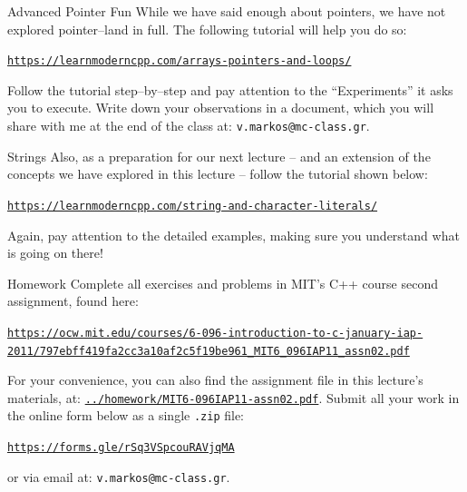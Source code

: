 \documentclass[aspectratio=169, 12pt]{beamer}
\newcommand{\ohref}[1]{\href{#1}{\texttt{#1}}}
\begin{document}
	\sectionframe
	
	\begin{frame}{Advanced Pointer Fun}
		While we have said enough about pointers, we have not explored pointer--land in full. The following tutorial will help you do so:
		\begin{center}
			\ohref{https://learnmoderncpp.com/arrays-pointers-and-loops/}
		\end{center}
		Follow the tutorial step--by--step and pay attention to the ``Experiments'' it asks you to execute. Write down your observations in a document, which you will share with me at the end of the class at: \texttt{v.markos@mc-class.gr}.
	\end{frame}
	
	\begin{frame}{Strings}
		Also, as a preparation for our next lecture -- and an extension of the concepts we have explored in this lecture -- follow the tutorial shown below:
		\begin{center}
			\ohref{https://learnmoderncpp.com/string-and-character-literals/}
		\end{center}
		Again, pay attention to the detailed examples, making sure you understand what is going on there!
	\end{frame}
	
	\begin{frame}{Homework}%
		Complete all exercises and problems in MIT's C++ course second assignment, found here:
		\begin{center}%
			\vspace{-1.0\topsep}%
			\small%
			\href{https://ocw.mit.edu/courses/6-096-introduction-to-c-january-iap-2011/797ebff419fa2cc3a10af2c5f19be961_MIT6_096IAP11_assn02.pdf}{\texttt{https://ocw.mit.edu/courses/6-096-introduction-to-c-january-iap-\\2011/797ebff419fa2cc3a10af2c5f19be961\_MIT6\_096IAP11\_assn02.pdf}}%
		\end{center}
		For your convenience, you can also find the assignment file in this lecture's materials, at: \ohref{../homework/MIT6-096IAP11-assn02.pdf}.
		Submit all your work in the online form below as a single \texttt{.zip} file:
		\begin{center}
			\ohref{https://forms.gle/rSq3VSpcouRAVjqMA}
		\end{center}
		or via email at: \texttt{v.markos@mc-class.gr}.
	\end{frame}
\end{document}
